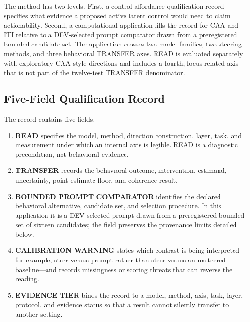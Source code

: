 \documentclass[manuscript,review,anonymous]{acmart}
\providecommand{\tightlist}{%
  \setlength{\itemsep}{0pt}\setlength{\parskip}{0pt}}
\begin{document}
The method has two levels. First, a control-affordance qualification record specifies what evidence a proposed active latent control would need to claim actionability. Second, a computational application fills the record for CAA and ITI relative to a DEV-selected prompt comparator drawn from a preregistered bounded candidate set. The application crosses two model families, two steering methods, and three behavioral TRANSFER axes. {}%
READ is evaluated separately with exploratory CAA-style directions and includes a fourth, focus-related axis that is not part of the twelve-test TRANSFER denominator. {}%
{}%

\subsection{Five-Field Qualification Record}\label{five-field-qualification-record}

The record contains five fields.

\begin{enumerate}
\def\labelenumi{\arabic{enumi}.}
\tightlist
\item
  \textbf{READ} specifies the model, method, direction construction, layer, task, and measurement under which an internal axis is legible. READ is a diagnostic precondition, not behavioral evidence.
\item
  \textbf{TRANSFER} records the behavioral outcome, intervention, estimand, uncertainty, point-estimate floor, and coherence result.
\item
  \textbf{BOUNDED PROMPT COMPARATOR} identifies the declared behavioral alternative, candidate set, and selection procedure. In this application it is a DEV-selected prompt drawn from a preregistered bounded set of sixteen candidates; the field preserves the provenance limits detailed below. {}%
\item
  \textbf{CALIBRATION WARNING} states which contrast is being interpreted---for example, steer versus prompt rather than steer versus an unsteered baseline---and records missingness or scoring threats that can reverse the reading.
\item
  \textbf{EVIDENCE TIER} binds the record to a model, method, axis, task, layer, protocol, and evidence status so that a result cannot silently transfer to another setting.
\end{enumerate}
\end{document}
